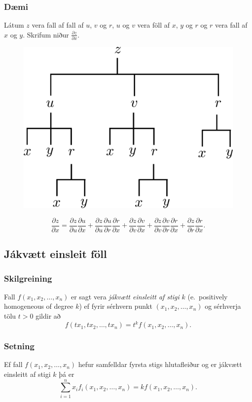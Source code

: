\subsubsection{Dæmi }
Látum $z$ vera fall af fall af $u$, $v$ og $r$, $u$ og $v$ vera föll af $x$, $y$ og $r$ og $r$ vera fall af $x$ og $y$. Skrifum niður $\frac{\partial z}{\partial x}$.

\begin{figure}[h!]
           \centering
            \includegraphics[width=0.45\linewidth]{chain4}
	\caption*{}
    \end{figure}
$$\frac{\partial z}{\partial x} = \frac{\partial z}{\partial u} \frac{\partial u}{\partial x} +\frac{\partial z}{\partial u} \frac{\partial u}{\partial r} \frac{\partial r}{\partial x} 
+ \frac{\partial z}{\partial v} \frac{\partial v}{\partial x} + \frac{\partial z}{\partial v} \frac{\partial v}{\partial r} \frac{\partial r}{\partial x} +\frac{\partial z}{\partial r} \frac{\partial r}{\partial x}.$$




\subsection{Jákvætt einsleit föll} 

\subsubsection{Skilgreining }

Fall $f(x_1, x_2, \ldots, x_n)$ er sagt vera {\em jákvætt einsleitt af stigi} $k$ (e.~positively homogeneous of degree $k$) ef fyrir sérhvern punkt $(x_1, x_2, \ldots, x_n)$ og sérhverja tölu $t>0$ gildir að 
$$f(tx_1, tx_2, \ldots, tx_n)=t^kf(x_1, x_2, \ldots, x_n).$$


\subsubsection{Setning }
 Ef fall $f(x_1, x_2, \ldots, x_n)$ hefur samfelldar fyrsta stigs hlutafleiður og er jákvætt einsleitt af stigi $k$ þá er 
$$\sum_{i=1}^n x_if_i(x_1, x_2, \ldots, x_n)=kf(x_1, x_2, \ldots, x_n).$$ 
 



